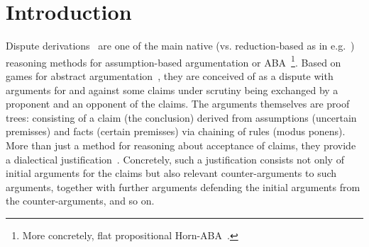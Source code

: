 \documentclass[conference]{IEEEtran}
\begin{document}
\section{Introduction}
Dispute derivations~\cite{Toni13,CravenT16} %
are one of the main native (vs. reduction-based as in e.g.~\cite{LehtonenWJ21}) %
reasoning methods for assumption-based argumentation or ABA~\cite{%
  Toni14%
}\footnote{More concretely, flat propositional Horn-ABA~\cite{CyrasHT21}.}.  Based on games for abstract argumentation~\cite{Caminada18}, %
they are conceived of as a dispute with arguments for and against some claims under scrutiny being exchanged by a proponent and an opponent of the claims.  The arguments themselves are proof trees: consisting of a claim (the conclusion) derived from assumptions (uncertain premisses) and facts (certain premisses) via chaining of rules (modus ponens).  More than just a method for reasoning about acceptance of claims, they provide a dialectical justification~\cite{Cyras0ABT21}.  Concretely, such a justification consists not only of initial arguments for the claims but also relevant counter-arguments to such arguments, together with further arguments defending the initial arguments from the counter-arguments, and so on.
\end{document}
